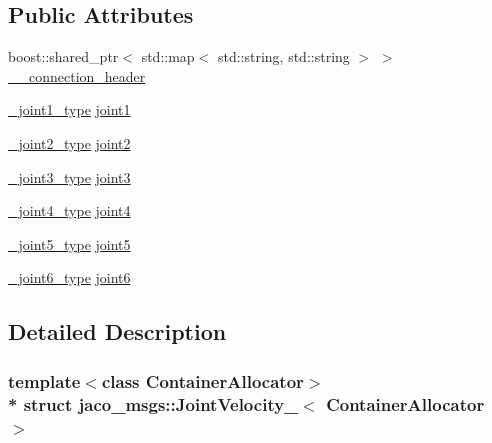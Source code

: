\subsection*{Public Attributes}
\begin{DoxyCompactItemize}
\item 
boost\+::shared\+\_\+ptr$<$ std\+::map$<$ std\+::string, std\+::string $>$ $>$ \hyperlink{structjaco__msgs_1_1JointVelocity___a25b3f657d79262342a571595d6ece714}{\+\_\+\+\_\+connection\+\_\+header}
\item 
\hyperlink{structjaco__msgs_1_1JointVelocity___ab6a0b6d8bf7015aff3a61c25b4bdf67b}{\+\_\+joint1\+\_\+type} \hyperlink{structjaco__msgs_1_1JointVelocity___ac67bdfc1a5c298799a523d8a9ba4b87e}{joint1}
\item 
\hyperlink{structjaco__msgs_1_1JointVelocity___a60a2a12b126edac2c3004568aa77f833}{\+\_\+joint2\+\_\+type} \hyperlink{structjaco__msgs_1_1JointVelocity___a4cb4b1f563bb3df4c9f2471f4682e33d}{joint2}
\item 
\hyperlink{structjaco__msgs_1_1JointVelocity___a516b16873309e426015d059948c9de5f}{\+\_\+joint3\+\_\+type} \hyperlink{structjaco__msgs_1_1JointVelocity___aa14dad415721aae4794da85ea545843f}{joint3}
\item 
\hyperlink{structjaco__msgs_1_1JointVelocity___a5433af2aa782711e694f2dea934d1e8a}{\+\_\+joint4\+\_\+type} \hyperlink{structjaco__msgs_1_1JointVelocity___a42d5c803c0510958d3ea50a5195fd430}{joint4}
\item 
\hyperlink{structjaco__msgs_1_1JointVelocity___a994fb0216a13a4bac0b44d75b293c8d1}{\+\_\+joint5\+\_\+type} \hyperlink{structjaco__msgs_1_1JointVelocity___af03f322785d0b58fbd4bd639ad48545c}{joint5}
\item 
\hyperlink{structjaco__msgs_1_1JointVelocity___aa08791b2618486b98789028edc8fecd7}{\+\_\+joint6\+\_\+type} \hyperlink{structjaco__msgs_1_1JointVelocity___ac4597081b297a5080198455fc6f13090}{joint6}
\end{DoxyCompactItemize}


\subsection{Detailed Description}
\subsubsection*{template$<$class Container\+Allocator$>$\\*
struct jaco\+\_\+msgs\+::\+Joint\+Velocity\+\_\+$<$ Container\+Allocator $>$}



